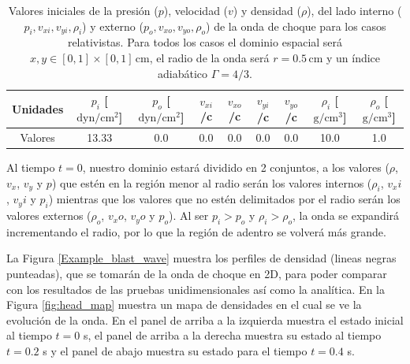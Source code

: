 \documentclass[12pt,a4paper]{book}
\begin{document}
\begin{table}[htbp]
  \begin{center}
  \begin{tabular}{|c|c|c|c|c|c|c|c|c|}
  \hline 
  \textbf{Unidades} & \textbf{$p_i$} [$\text{dyn}/\text{cm}^2$] & 
  \textbf{$p_o$} [$\text{dyn}/\text{cm}^2$] & 
  \textbf{$v_{xi}$}/c & \textbf{$v_{xo}$}/c  & \textbf{$v_{yi}$}/c & \textbf{$v_{yo}$}/c  & 
  \textbf{$\rho_i$} [$\text{g}/\text{cm}^3$]& 
  \textbf{$\rho_o$} [$\text{g}/\text{cm}^3$]\\ 
  \hline 
  Valores & 13.33  & 0.0  & 0.0 & 0.0 & 0.0 & 0.0 & 10.0  & 1.0 \\ 
  \hline 
  \end{tabular}
  \caption{\label{Cuadro_parametros_choque_2D} Valores iniciales 
  de la presión ($p$), velocidad ($v$)
  y densidad ($\rho$), del lado interno ($p_i, v_{xi}, v_{yi}, \rho_i$) y 
  externo ($p_o, v_{xo}, v_{yo}, \rho_o$) de la onda de choque
  para los casos relativistas. Para todos los
  casos el dominio espacial será $x, y \in [0,1]\times[0,1] \, \text{cm}$, el radio de la onda
  será $r = 0.5 \, \text{cm}$ y un índice adiabático $\Gamma = 4/3$.}
  \end{center}
\end{table}

Al tiempo $t = 0$, nuestro dominio estará dividido en 2 conjuntos, a los valores ($\rho$, $v_x$, $v_y$
y $p$) que estén en la región menor al radio serán los valores internos ($\rho_i$, $v_xi$, $v_yi$ 
y $p_i$) mientras que los valores que no estén delimitados por el radio serán los valores externos
($\rho_o$, $v_xo$, $v_yo$ y $p_o$). Al ser $p_i > p_o$ y $\rho_i > \rho_o$, la onda se 
expandirá incrementando el radio, por lo que la región de adentro se volverá más grande.



La Figura \ref{Example_blast_wave} muestra los perfiles de densidad (lineas negras punteadas), que se tomarán de la onda de choque en 2D, para poder comparar con los resultados de las pruebas unidimensionales así 
como la analítica. En la Figura \ref{fig:head_map} muestra un mapa de densidades en el cual se ve la evolución de la onda. En el panel de arriba a la izquierda muestra el estado inicial al tiempo $t = 0$ s, 
el panel de arriba a la derecha muestra su estado al tiempo $t = 0.2$ s y el panel de abajo muestra su estado para el tiempo $t = 0.4$ s. 
\end{document}
